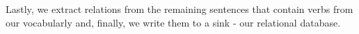 Lastly, we extract relations from the remaining sentences that contain verbs from our vocabularly and, finally, we write them to a sink - our relational database.
